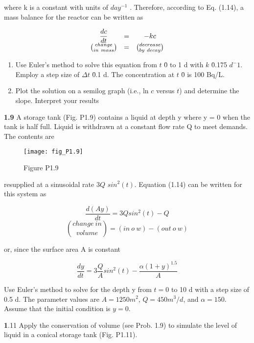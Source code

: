 \documentclass[../main.tex]{subfiles}
\begin{document}
\begin{multicols}{2}
where k is a constant with units of $day^{-1}$
. Therefore, according to Eq. (1.14), a mass balance for the reactor can be
written as

\[ \begin{array}{c c c}
	\dfrac{dc}{dt} & =& -kc\\
	\binom{change}{in \ mass} & =& \binom{decrease}{by \ decay} 
	
\end{array} \]

\begin{enumerate}[label=(\alph*)]
	\item Use Euler's method to solve this equation from $t$ \= 0 to
	1 d with $k$ \= 0.175 $d^-1$. Employ a step size of $\Delta t$ \= 0.1 d.
	The concentration at $t$ \= 0 is 100 Bq/L.
	\item Plot the solution on a semilog graph (i.e., ln $c$ versus $t$)
	and determine the slope. Interpret your results
\end{enumerate}

\textbf{1.9} A storage tank (Fig. P1.9) contains a liquid at depth y
where y = 0 when the tank is half full. Liquid is withdrawn
at a constant flow rate Q to meet demands. The contents are


\begin{figure}[H]
	\centering
	
	\texttt{[image: fig\_P1.9]}
	\caption*{Figure P1.9}
   \label{fig_P1.9}
\end{figure}

resupplied at a sinusoidal rate $3Q$ $sin^2(t)$. Equation (1.14)
can be written for this system as

$$ \dfrac{d(Ay)}{dt}=3Q sin^2(t)-Q$$
$$ \binom{change \ in}{volume} = (in \ o \ w) - (out \ o \ w) $$

or, since the surface area A is constant

$$\dfrac{dy}{dt}=3\dfrac{Q}{A}sin^2(t)- \dfrac{\alpha(1+y)^{1.5}}{A} $$

Use Euler's method to solve for the depth y from $t = 0$ to
10 d with a step size of 0.5 d. The parameter values are $A =
1250 m^2$, $Q = 450 m^3/d$, and $\alpha = 150$. Assume that the initial condition is $y = 0$.

\textbf1.11 Apply the conservation of volume (see Prob. 1.9) to simulate the level of liquid in a conical storage tank (Fig. P1.11).

\begin{figure}[H]
	\centering
	

\end{figure}
\end{multicols}
\end{document}
